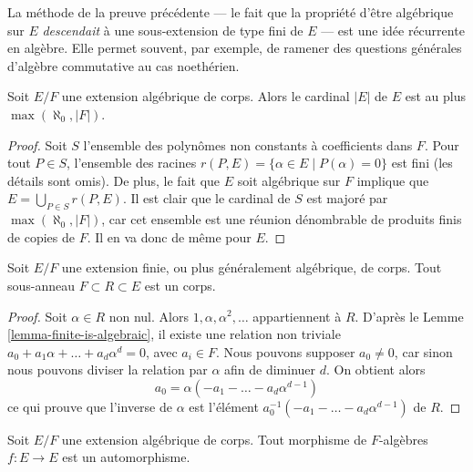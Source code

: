 \noindent
La méthode de la preuve précédente --- le fait que la propriété d'être algébrique
sur $E$ {\it descendait} à une sous-extension de type fini
de $E$ --- est une idée récurrente en algèbre.
Elle permet souvent, par exemple, de ramener des questions générales d'algèbre commutative
au cas noethérien.

\begin{lemma}
\label{lemma-size-algebraic-extension}
Soit $E/F$ une extension algébrique de corps. Alors le cardinal $|E|$
de $E$ est au plus $\max(\aleph_0, |F|)$.
\end{lemma}

\begin{proof}
Soit $S$ l'ensemble des polynômes non constants à coefficients dans $F$.
Pour tout $P \in S$, l'ensemble des racines
$r(P, E) = \{\alpha \in E \mid P(\alpha) = 0\}$
est fini (les détails sont omis). De plus, le fait que $E$ soit algébrique
sur $F$ implique que $E = \bigcup_{P \in S} r(P, E)$.
Il est clair que le cardinal de $S$ est majoré par $\max(\aleph_0, |F|)$,
car cet ensemble est une réunion dénombrable de produits finis de copies de $F$.
Il en va donc de même pour $E$.
\end{proof}

\begin{lemma}
\label{lemma-subalgebra-algebraic-extension-field}
Soit $E/F$ une extension finie, ou plus généralement algébrique, de corps.
Tout sous-anneau $F \subset R \subset E$ est un corps.
\end{lemma}

\begin{proof}
Soit $\alpha \in R$ non nul. Alors $1, \alpha, \alpha^2, \ldots$
appartiennent à $R$. D'après le Lemme \ref{lemma-finite-is-algebraic},
il existe une relation non triviale
$a_0 + a_1 \alpha + \ldots + a_d \alpha^d = 0$, avec $a_i \in F$.
Nous pouvons supposer $a_0 \not = 0$, car sinon nous pouvons diviser la relation
par $\alpha$ afin de diminuer $d$. On obtient alors
$$
a_0 = \alpha (- a_1  - \ldots - a_d \alpha^{d - 1})
$$
ce qui prouve que l'inverse de $\alpha$ est l'élément
$a_0^{-1} (- a_1  - \ldots - a_d \alpha^{d - 1})$
de $R$.
\end{proof}

\begin{lemma}
\label{lemma-algebraic-extension-self-map}
Soit $E/F$ une extension algébrique de corps. Tout morphisme de $F$-algèbres
$f : E \to E$ est un automorphisme.
\end{lemma}

